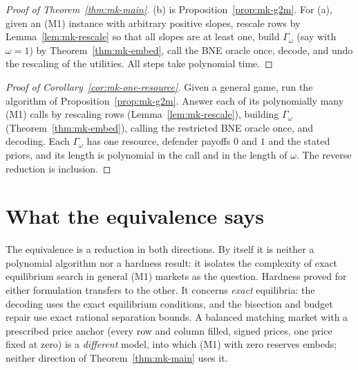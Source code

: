 \begin{proof}[Proof of Theorem~\ref{thm:mk-main}]
(b) is Proposition~\ref{prop:mk-g2m}. For (a), given an (M1) instance with arbitrary positive slopes,
rescale rows by Lemma~\ref{lem:mk-rescale} so that all slopes are at least one, build
$\Gamma_\omega$ (say with $\omega=1$) by Theorem~\ref{thm:mk-embed}, call the BNE oracle once,
decode, and undo the rescaling of the utilities. All steps take polynomial time.
\end{proof}

\begin{proof}[Proof of Corollary~\ref{cor:mk-one-resource}]
Given a general game, run the algorithm of Proposition~\ref{prop:mk-g2m}. Answer each of its
polynomially many (M1) calls by rescaling rows (Lemma~\ref{lem:mk-rescale}), building $\Gamma_\omega$
(Theorem~\ref{thm:mk-embed}), calling the restricted BNE oracle once, and decoding. Each
$\Gamma_\omega$ has one resource, defender payoffs $0$ and $1$ and the stated priors, and its length is
polynomial in the call and in the length of $\omega$. The reverse reduction is inclusion.
\end{proof}

\section{What the equivalence says}\label{sec:mk-consequences}

The equivalence is a reduction in both directions. By itself it is neither a polynomial algorithm nor
a hardness result: it isolates the complexity of exact equilibrium search in general (M1) markets as the
question. Hardness proved for either formulation transfers to the other. It concerns \emph{exact}
equilibria: the decoding uses the exact equilibrium conditions, and the bisection and budget repair use
exact rational separation bounds. A balanced matching market with a prescribed price anchor (every row
and column filled, signed prices, one price fixed at zero) is a \emph{different} model, into which (M1)
with zero reserves embeds; neither direction of Theorem~\ref{thm:mk-main} uses it.
